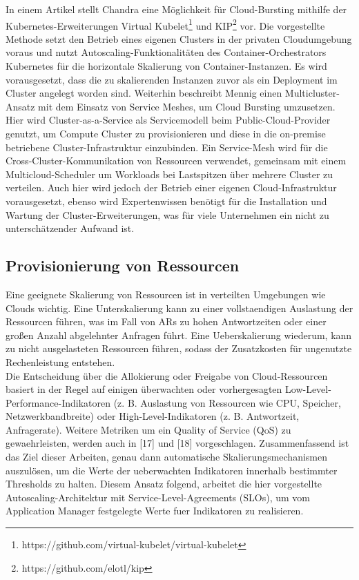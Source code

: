 \documentclass[runningheads]{llncs}
\begin{document}
In einem Artikel stellt Chandra \cite{chandra_cloud_2020} eine Möglichkeit für Cloud-Bursting mithilfe der Kubernetes-Erweiterungen Virtual Kubelet\footnote{https://github.com/virtual-kubelet/virtual-kubelet} und KIP\footnote{https://github.com/elotl/kip} vor. Die vorgestellte Methode setzt den Betrieb eines eigenen Clusters in der privaten Cloudumgebung voraus und nutzt Autoscaling-Funktionalitäten des Container-Orchestrators Kubernetes für die horizontale Skalierung von Container-Instanzen. Es wird vorausgesetzt, dass die zu skalierenden Instanzen zuvor als ein Deployment im Cluster angelegt worden sind. Weiterhin beschreibt Mennig \cite{mennig_cloud_2020} einen Multicluster-Ansatz mit dem Einsatz von Service Meshes, um Cloud Bursting umzusetzen. Hier wird Cluster-as-a-Service als Servicemodell beim Public-Cloud-Provider genutzt, um Compute Cluster zu provisionieren und diese in die on-premise betriebene Cluster-Infrastruktur einzubinden. Ein Service-Mesh wird für die Cross-Cluster-Kommunikation von Ressourcen verwendet, gemeinsam mit einem Multicloud-Scheduler um Workloads bei Lastspitzen über mehrere Cluster zu verteilen. Auch hier wird jedoch der Betrieb einer eigenen Cloud-Infrastruktur vorausgesetzt, ebenso wird Expertenwissen benötigt für die Installation und Wartung der Cluster-Erweiterungen, was für viele Unternehmen ein nicht zu unterschätzender Aufwand ist.
	
\subsection{Provisionierung von Ressourcen}

Eine geeignete Skalierung von Ressourcen ist in verteilten Umgebungen wie Clouds wichtig. Eine Unterskalierung kann zu einer vollstaendigen Auslastung der Ressourcen führen, was im Fall von ARs zu hohen Antwortzeiten oder einer großen Anzahl abgelehnter Anfragen führt.  Eine Ueberskalierung wiederum, kann zu nicht ausgelasteten Ressourcen führen, sodass der Zusatzkosten für ungenutzte Rechenleistung entstehen. \\

Die Entscheidung über die Allokierung oder Freigabe von Cloud-Ressourcen basiert in der Regel auf einigen überwachten oder vorhergesagten Low-Level-Performance-Indikatoren (z. B. Auslastung von Ressourcen wie CPU, Speicher, Netzwerkbandbreite) oder High-Level-Indikatoren (z. B. Antwortzeit, Anfragerate). Weitere Metriken um ein Quality of Service (QoS) zu gewaehrleisten, werden auch in [17] und [18] vorgeschlagen. Zusammenfassend ist das Ziel dieser Arbeiten, genau dann automatische Skalierungsmechanismen auszulösen, um die Werte der ueberwachten Indikatoren innerhalb bestimmter Thresholds zu halten. Diesem Ansatz folgend, arbeitet die hier vorgestellte Autoscaling-Architektur mit Service-Level-Agreements (SLOs), um vom Application Manager festgelegte Werte fuer Indikatoren zu realisieren. \\
\end{document}
